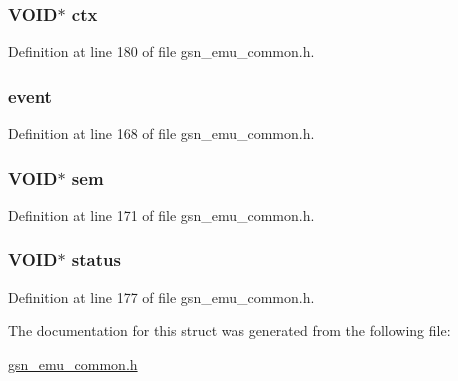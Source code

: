 \hypertarget{a00062_add401254b29adaa41706c97d1c8d3e89}{
\subsubsection[{ctx}]{\setlength{\rightskip}{0pt plus 5cm}VOID$\ast$ {\bf ctx}}}
\label{a00062_add401254b29adaa41706c97d1c8d3e89}


Definition at line 180 of file gsn\_\-emu\_\-common.h.

\hypertarget{a00062_a62ef57f8dfa7ce1e8577994709b26c04}{
\subsubsection[{event}]{ {\bf event}}}
\label{a00062_a62ef57f8dfa7ce1e8577994709b26c04}


Definition at line 168 of file gsn\_\-emu\_\-common.h.

\hypertarget{a00062_a9364170a1f540808e145cbcd3c4c97fd}{
\subsubsection[{sem}]{\setlength{\rightskip}{0pt plus 5cm}VOID$\ast$ {\bf sem}}}
\label{a00062_a9364170a1f540808e145cbcd3c4c97fd}


Definition at line 171 of file gsn\_\-emu\_\-common.h.

\hypertarget{a00062_a547fbc73f5b89c67cd48afd6feca9ba4}{
\subsubsection[{status}]{\setlength{\rightskip}{0pt plus 5cm}VOID$\ast$ {\bf status}}}
\label{a00062_a547fbc73f5b89c67cd48afd6feca9ba4}


Definition at line 177 of file gsn\_\-emu\_\-common.h.



The documentation for this struct was generated from the following file:\begin{DoxyCompactItemize}
\item 
\hyperlink{a00490}{gsn\_\-emu\_\-common.h}\end{DoxyCompactItemize}
